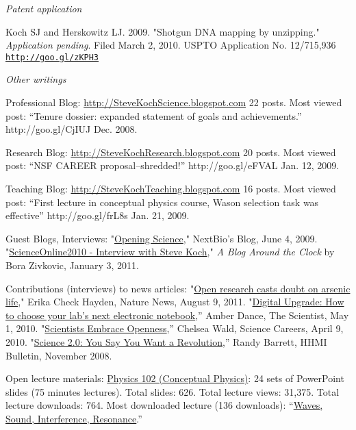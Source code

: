 \documentclass[11pt]{article}
\begin{document}

\bigskip 
 
\noindent\emph{Patent application \vspace{0.05in}}

\ind Koch SJ and Herskowitz LJ. 2009. "Shotgun DNA mapping by unzipping." \emph{Application pending}. Filed March 2, 2010. USPTO  Application No. 12/715,936 {\scriptsize  \texttt{\href{http://goo.gl/zKPH3}{http://goo.gl/zKPH3}}}


\bigskip 
\noindent\emph{Other writings \vspace{0.05in}}


\ind Professional Blog: \href{http://goo.gl/5GKbQ}{http://SteveKochScience.blogspot.com}  22 posts. Most viewed post: “Tenure dossier: expanded statement of goals and achievements.” http://goo.gl/CjIUJ Dec. 2008.

\ind Research Blog: \href{http://goo.gl/yB68J}{http://SteveKochResearch.blogspot.com} 20 posts. Most viewed post: “NSF CAREER proposal--shredded!” http://goo.gl/eFVAL Jan. 12, 2009.

\ind Teaching Blog: \href{http://goo.gl/m8sfa}{http://SteveKochTeaching.blogspot.com} 16 posts. Most viewed post: “First lecture in conceptual physics course, Wason selection task was effective” http://goo.gl/frL8s Jan. 21, 2009.

\ind Guest Blogs, Interviews: "\href{http://goo.gl/5jvJY}{Opening Science}," NextBio's Blog, June 4, 2009. "\href{http://goo.gl/qvAuU}{ScienceOnline2010 - Interview with Steve Koch}," \emph{A Blog Around the Clock} by Bora Zivkovic, January 3, 2011.

\ind Contributions (interviews) to news articles: "\href{http://goo.gl/N8INQ}{Open research casts doubt on arsenic life}," Erika Check Hayden, Nature News, August 9, 2011. "\href{http://goo.gl/bQOom}{Digital Upgrade: How to choose your lab’s next electronic notebook},” Amber Dance, The Scientist, May 1, 2010. "\href{http://goo.gl/QEtg7}{Scientists Embrace Openness},” Chelsea Wald, Science Careers, April 9, 2010. "\href{http://goo.gl/Dx9WU}{Science 2.0: You Say You Want a Revolution},” Randy Barrett, HHMI Bulletin, November 2008.   

\ind Open lecture materials: \href{http://goo.gl/2L7kC}{Physics 102 (Conceptual Physics)}: 24 sets of PowerPoint slides (75 minutes lectures).  Total slides: 626. Total lecture views: 31,375. Total lecture downloads: 764. Most downloaded lecture (136 downloads): “\href{http://goo.gl/FCsfM}{Waves, Sound, Interference, Resonance}.” 
\end{document}

